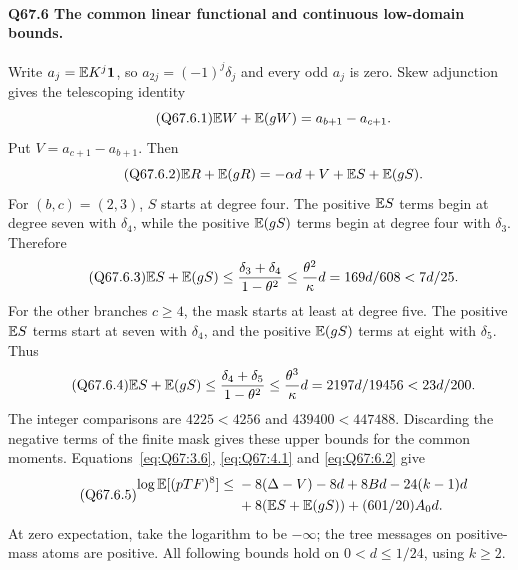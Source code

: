 \paragraph{Q67.6 The common linear functional and continuous low-domain bounds.}
Write \(a_j=\allowbreak \mathbb E K^j\mathbf1\), so \(a_{2j}=\allowbreak (-1)^j\delta_j\) and every
odd \(a_j\) is zero. Skew adjunction gives the telescoping identity
\begin{equation}\tag{Q67.6.1}\label{eq:Q67:6.1}
\mathbb E W+\mathbb E(gW)=a_{b+1}-a_{c+1}.
\end{equation}
Put \(V=\allowbreak a_{c+1}-a_{b+1}\). Then
\begin{equation}\tag{Q67.6.2}\label{eq:Q67:6.2}
\mathbb E R+\mathbb E(gR)=-\alpha d+V+\mathbb E S+\mathbb E(gS).
\end{equation}
For \((b,\allowbreak c)=\allowbreak (2,\allowbreak 3)\), \(S\) starts at degree four. The positive
\(\mathbb E S\) terms begin at degree seven with \(\delta_4\), while the
positive \(\mathbb E(gS)\) terms begin at degree four with \(\delta_3\).
Therefore
\begin{equation}\tag{Q67.6.3}\label{eq:Q67:6.3}
\mathbb E S+\mathbb E(gS)\le\frac{\delta_3+\delta_4}{1-\theta^2}
\le\frac{\theta^2}{\kappa}d=169d/608<7d/25.
\end{equation}
For the other branches \(c\ge\allowbreak 4\), the mask starts at least at degree
five. The positive \(\mathbb E S\) terms start at seven with \(\delta_4\),
and the positive \(\mathbb E(gS)\) terms at eight with \(\delta_5\). Thus
\begin{equation}\tag{Q67.6.4}\label{eq:Q67:6.4}
\mathbb E S+\mathbb E(gS)\le\frac{\delta_4+\delta_5}{1-\theta^2}
\le\frac{\theta^3}{\kappa}d=2197d/19456<23d/200.
\end{equation}
The integer comparisons are \(4225<\allowbreak 4256\) and \(439400<\allowbreak 447488\).
Discarding the negative terms of the finite mask gives these upper
bounds for the common moments.
Equations~\eqref{eq:Q67:3.6}, \eqref{eq:Q67:4.1} and
\eqref{eq:Q67:6.2} give
\begin{equation}\tag{Q67.6.5}\label{eq:Q67:6.5}
\begin{aligned}
\log\mathbb E[(pTF)^8]\le{}&-8(\Delta-V)-8d+8Bd-24(k-1)d\\
 &+8(\mathbb E S+\mathbb E(gS))+(601/20)A_0d.
\end{aligned}
\end{equation}
At zero expectation, take the logarithm to be \(-\infty\);
the tree messages on positive-mass atoms are positive.
All following bounds hold on \(0<\allowbreak d\le\allowbreak 1/24\), using \(k\ge\allowbreak 2\).


